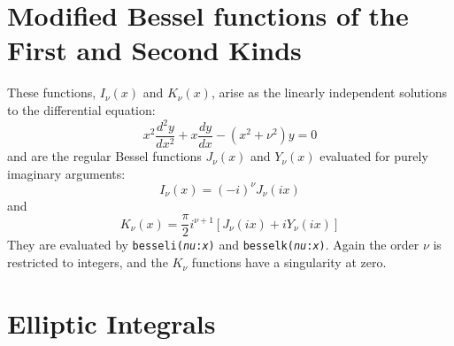 \documentclass{article}
\begin{document}
\section*{Modified Bessel functions of the First and Second Kinds}

These functions, $I_\nu(x)$ and $K_\nu(x)$, arise as the linearly
independent solutions to the differential equation:
\begin{equation}
x^2\frac{d^2y}{dx^2} + x\frac{dy}{dx} - (x^2 + \nu^2)y = 0
\end{equation}
and are the regular Bessel functions $J_\nu(x)$ and $Y_\nu(x)$
evaluated for purely imaginary arguments:
\begin{equation}
I_\nu(x) = (-i)^\nu J_\nu(ix)
\end{equation}
and
\begin{equation}
K_\nu(x) = \frac{\pi}{2}i^{\nu+1}[J_\nu(ix) + iY_\nu(ix)]
\end{equation}
They are evaluated by \texttt{besseli(\textsl{nu}:\textsl{x})} and
\texttt{besselk(\textsl{nu}:\textsl{x})}.  Again the order $\nu$ is
restricted to integers, and the $K_\nu$ functions have a singularity
at zero.



\section*{Elliptic Integrals}
\end{document}
